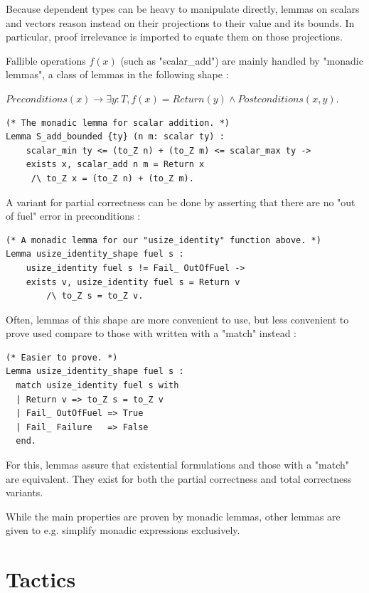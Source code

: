 \documentclass{article}
\begin{document}
\medskip

Because dependent types can be heavy to manipulate directly, lemmas on scalars and vectors reason instead on their projections to their value and its bounds. In particular, proof irrelevance is imported to equate them on those projections.

Fallible operations $f(x)$ (such as "scalar\_add") are mainly handled by "monadic lemmas", a class of lemmas in the following shape :

$Preconditions(x) \rightarrow \exists y:T, f(x) = Return(y) \wedge Postconditions(x, y)$.

\begin{verbatim}
(* The monadic lemma for scalar addition. *)
Lemma S_add_bounded {ty} (n m: scalar ty) :
    scalar_min ty <= (to_Z n) + (to_Z m) <= scalar_max ty ->
    exists x, scalar_add n m = Return x
     /\ to_Z x = (to_Z n) + (to_Z m).
\end{verbatim}

A variant for partial correctness can be done by asserting that there are no "out of fuel" error in preconditions :

\begin{verbatim}
(* A monadic lemma for our "usize_identity" function above. *)
Lemma usize_identity_shape fuel s :
    usize_identity fuel s != Fail_ OutOfFuel ->
    exists v, usize_identity fuel s = Return v
        /\ to_Z s = to_Z v.
\end{verbatim}

Often, lemmas of this shape are more convenient to use, but less convenient to prove used compare to those with written with a "match" instead :

\begin{verbatim}
(* Easier to prove. *)
Lemma usize_identity_shape fuel s :
  match usize_identity fuel s with
  | Return v => to_Z s = to_Z v
  | Fail_ OutOfFuel => True
  | Fail_ Failure   => False
  end.
\end{verbatim}

For this, lemmas assure that existential formulations and those with a "match" are equivalent. They exist for both the partial correctness and total correctness variants.

\medskip

While the main properties are proven by monadic lemmas, other lemmas are given to e.g. simplify monadic expressions exclusively.

\section{Tactics}
\label{sec:Tactics}
\end{document}
